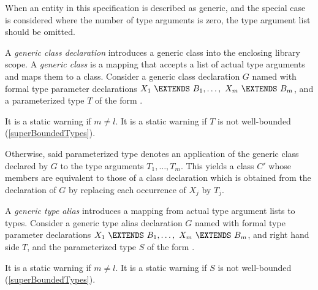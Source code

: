 \documentclass{article}
\begin{document}
\LMHash{}
When an entity in this specification is described as generic,
and the special case is considered where the number of type arguments is zero,
the type argument list should be omitted.


\LMHash{}
A {\em generic class declaration} introduces a generic class into the enclosing library scope.
A {\em generic class} is a mapping that accepts a list of actual type arguments and maps them to a class.
Consider a generic class declaration $G$ named  with formal type parameter declarations
$X_1\ \EXTENDS\ B_1, \ldots,\ X_m\ \EXTENDS\ B_m$,
and a parameterized type $T$ of the form .

\LMHash{}
It is a static warning if $m \not= l$.
It is a static warning if $T$ is not well-bounded
(\ref{superBoundedTypes}).


\LMHash{}
Otherwise, said parameterized type  denotes an application of the generic class declared by $G$ to the type arguments $T_1, \ldots, T_m$.
This yields a class $C'$ whose members are equivalent to those of a class declaration which is obtained from the declaration of $G$ by replacing each occurrence of $X_j$ by $T_j$.

\LMHash{}
A {\em generic type alias} introduces a mapping from actual type argument lists to types.
Consider a generic type alias declaration $G$ named  with formal type parameter declarations
$X_1\ \EXTENDS\ B_1, \ldots,\ X_m\ \EXTENDS\ B_m$,
and right hand side $T$,
and the parameterized type $S$ of the form .

\LMHash{}
It is a static warning if $m \not= l$.
It is a static warning if $S$ is not well-bounded
(\ref{superBoundedTypes}).
\end{document}
